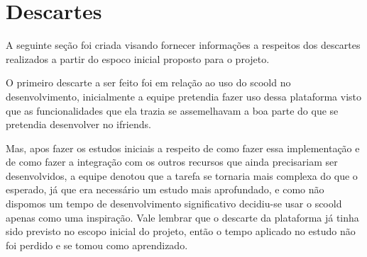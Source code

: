 \section{Descartes}
A seguinte seção foi criada visando fornecer informações a respeitos dos descartes realizados a partir do espoco inicial proposto para o projeto. 

O primeiro descarte a ser feito foi em relação ao uso do \gls{scoold} no desenvolvimento, inicialmente a equipe pretendia fazer uso dessa plataforma visto que as funcionalidades que ela trazia se assemelhavam a boa parte do que se pretendia desenvolver no \gls{ifriends}. 

Mas, apos fazer os estudos iniciais a respeito de como fazer essa implementação e de como fazer a integração com os outros recursos que ainda precisariam ser desenvolvidos, a equipe denotou que a tarefa se tornaria mais complexa do que o esperado, já que era necessário um estudo mais aprofundado, e como não dispomos um tempo de desenvolvimento significativo decidiu-se usar o \gls{scoold} apenas como uma inspiração. Vale lembrar que o descarte da plataforma já tinha sido previsto no escopo inicial do projeto, então o tempo aplicado no estudo não foi perdido e se tomou como aprendizado.


